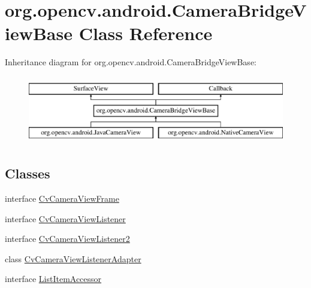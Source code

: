 \hypertarget{classorg_1_1opencv_1_1android_1_1_camera_bridge_view_base}{}\section{org.\+opencv.\+android.\+Camera\+Bridge\+View\+Base Class Reference}
\label{classorg_1_1opencv_1_1android_1_1_camera_bridge_view_base}
Inheritance diagram for org.\+opencv.\+android.\+Camera\+Bridge\+View\+Base\+:\begin{figure}[H]
\begin{center}
\leavevmode
\includegraphics[height=3.000000cm]{classorg_1_1opencv_1_1android_1_1_camera_bridge_view_base}
\end{center}
\end{figure}
\subsection*{Classes}
\begin{DoxyCompactItemize}
\item 
interface \mbox{\hyperlink{interfaceorg_1_1opencv_1_1android_1_1_camera_bridge_view_base_1_1_cv_camera_view_frame}{Cv\+Camera\+View\+Frame}}
\item 
interface \mbox{\hyperlink{interfaceorg_1_1opencv_1_1android_1_1_camera_bridge_view_base_1_1_cv_camera_view_listener}{Cv\+Camera\+View\+Listener}}
\item 
interface \mbox{\hyperlink{interfaceorg_1_1opencv_1_1android_1_1_camera_bridge_view_base_1_1_cv_camera_view_listener2}{Cv\+Camera\+View\+Listener2}}
\item 
class \mbox{\hyperlink{classorg_1_1opencv_1_1android_1_1_camera_bridge_view_base_1_1_cv_camera_view_listener_adapter}{Cv\+Camera\+View\+Listener\+Adapter}}
\item 
interface \mbox{\hyperlink{interfaceorg_1_1opencv_1_1android_1_1_camera_bridge_view_base_1_1_list_item_accessor}{List\+Item\+Accessor}}
\end{DoxyCompactItemize}
